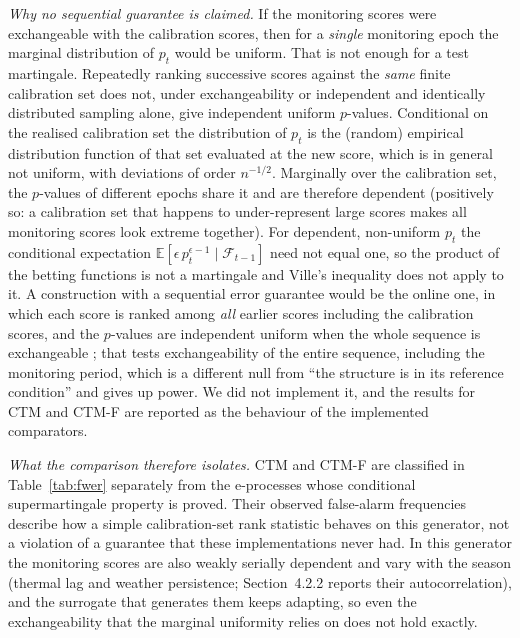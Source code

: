 \documentclass[12pt,a4paper]{article}
\newenvironment{revblock}{}{}
\newenvironment{revblock}{\begingroup\color{revcol}}{\endgroup}
\newcommand{\rtwo}[1]{#1}
\newcommand{\rtwo}[1]{{\color{revcolb}#1}}
\newcommand{\E}{\mathbb{E}}
\newcommand{\F}{\mathcal{F}}
\begin{document}
\begin{revblock}
\rtwo{\emph{Why no sequential guarantee is claimed.} If the monitoring scores were exchangeable with the calibration scores, then for a \emph{single} monitoring epoch the marginal distribution of $p_t$ would be uniform.} \rtwo{That is not enough for a test martingale.} \rtwo{Repeatedly ranking successive scores against the \emph{same} finite calibration set does not, under exchangeability or independent and identically distributed sampling alone, give independent uniform $p$-values.} \rtwo{Conditional on the realised calibration set the distribution of $p_t$ is the (random) empirical distribution function of that set evaluated at the new score, which is in general not uniform, with deviations of order $n^{-1/2}$.} \rtwo{Marginally over the calibration set, the $p$-values of different epochs share it and are therefore dependent (positively so: a calibration set that happens to under-represent large scores makes all monitoring scores look extreme together).} \rtwo{For dependent, non-uniform $p_t$ the conditional expectation $\E[\epsilon\,p_t^{\epsilon-1}\mid\F_{t-1}]$ need not equal one, so the product of the betting functions is not a martingale and Ville's inequality does not apply to it.} \rtwo{A construction with a sequential error guarantee would be the online one, in which each score is ranked among \emph{all} earlier scores including the calibration scores, and the $p$-values are independent uniform when the whole sequence is exchangeable \citep{vovk2021testing}; that tests exchangeability of the entire sequence, including the monitoring period, which is a different null from ``the structure is in its reference condition'' and gives up power.} \rtwo{We did not implement it, and the results for CTM and CTM-F are reported as the behaviour of the implemented comparators.}

\rtwo{\emph{What the comparison therefore isolates.} CTM and CTM-F are classified in Table~\ref{tab:fwer} separately from the e-processes whose conditional supermartingale property is proved.} \rtwo{Their observed false-alarm frequencies describe how a simple calibration-set rank statistic behaves on this generator, not a violation of a guarantee that these implementations never had.} \rtwo{In this generator the monitoring scores are also weakly serially dependent and vary with the season (thermal lag and weather persistence; Section~4.2.2 reports their autocorrelation), and the surrogate that generates them keeps adapting, so even the exchangeability that the marginal uniformity relies on does not hold exactly.}
\end{revblock}
\end{document}
